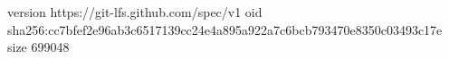 version https://git-lfs.github.com/spec/v1
oid sha256:cc7bfef2e96ab3c6517139cc24e4a895a922a7c6bcb793470e8350c03493c17e
size 699048
